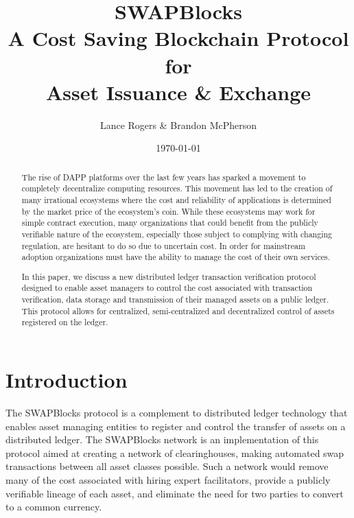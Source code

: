 \documentclass[12pt]{article}
\title{SWAPBlocks \\A Cost Saving Blockchain Protocol for\\
Asset Issuance \& Exchange}
\author{Lance Rogers \& Brandon McPherson}
\date{\today}
\begin{document}
\maketitle

\begin{abstract}
	

	
	
The rise of DAPP platforms over the last few years has sparked a movement to 
completely decentralize computing resources.  This movement has led to 
the creation of many irrational ecosystems where the cost and reliability of
applications is determined by the market price of the ecosystem's coin. %
While these ecosystems may work for simple contract execution,
many organizations that could benefit from the publicly verifiable nature of the
ecosystem, especially those subject to complying with changing regulation,
	are hesitant to do so due to uncertain cost. 
In order for mainstream adoption organizations must have the ability to manage
the cost of their own services.

In this paper, we discuss a new distributed ledger transaction verification
protocol designed to enable asset managers to control the cost associated with
transaction verification, data storage and transmission of their managed assets on 
	a public ledger.
This protocol allows for centralized, semi-centralized 
and decentralized control of assets registered on the ledger. 


\end{abstract}

\pagebreak

\tableofcontents

\pagebreak

\section{Introduction}



The SWAPBlocks protocol is a complement to distributed ledger technology that enables
asset managing entities to register and control the transfer of assets on a distributed
ledger.  The SWAPBlocks network is an implementation of this protocol aimed at creating a network
of clearinghouses, making automated swap transactions between all asset classes possible.  Such a network
would remove many of the cost associated with hiring expert facilitators, provide a publicly verifiable
lineage of each asset, and eliminate the need for two parties to convert to a common currency.
\end{document}
